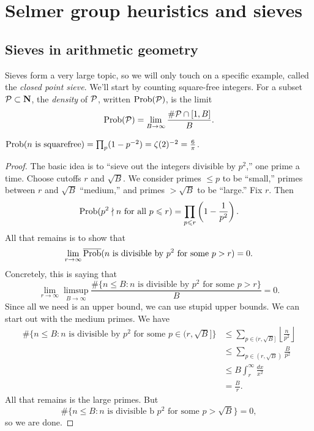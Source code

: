 
\section{Selmer group heuristics and sieves}





\subsection{Sieves in arithmetic geometry}

Sieves form a very large topic, so we will only touch on a specific example, 
called the \emph{closed point sieve}. We'll start by counting square-free 
integers. For a subset $\mathcal{P}\subset \mathbf{N}$, the \emph{density} of $\mathcal{P}$, written 
$\operatorname{Prob}(\mathcal{P})$, is the limit 
\[
  \operatorname{Prob}(\mathcal{P}) = \lim_{B\to \infty} \frac{\# \mathcal{P}\cap [1,B]}{B} .
\]

\begin{theorem}
$\operatorname{Prob}(n\text{ is squarefree})=\prod_p (1-p^{-2}) = \zeta(2)^{-2} = \frac{6}{\pi}$. 
\end{theorem}

\begin{proof}
The basic idea is to ``sieve out the integers divisible by $p^2$,'' one prime 
a time. Choose cutoffs $r$ and $\sqrt B$. We consider primes $\leq p$ to be 
``small,'' primes between $r$ and $\sqrt B$ ``medium,'' and primes $>\sqrt B$ 
to be ``large.'' Fix $r$. Then 
\[
  \operatorname{Prob}(p^2\nmid n\text{ for all $p\leqslant r$}) = \prod_{p\leqslant r} \left(1-\frac{1}{p^2}\right) .
\]
All that remains is to show that 
\[
  \lim_{r\to \infty} \overline{\operatorname{Prob}}(n\text{ is divisible by $p^2$ for some $p>r$}) = 0 .
\]
Concretely, this is saying that 
\[
  \lim_{r\to\infty} \limsup_{B\to \infty} \frac{\#\{n\leq B:n\text{ is divisible by $p^2$ for some $p>r$}\}}{B} = 0 .
\]
Since all we need is an upper bound, we can use stupid upper bounds. We can 
start out with the medium primes. We have 
\begin{align*}
  \# \{n\leq B:n\text{ is divisible by $p^2$ for some $p\in (r,\sqrt B]$}\} 
    &\leq \sum_{p\in (r,\sqrt B]} \left\lfloor\frac{n}{p^2}\right\rfloor \\
    &\leq \sum_{p\in (r,\sqrt B)} \frac{B}{p^2} \\
    &\leq B\int_r^\infty \frac{dx}{x^2} \\
    &= \frac{B}{r} .
\end{align*}
All that remains is the large primes. But 
\[
  \#\{n\leq B:n\text{ is divisible b $p^2$ for some $p>\sqrt B$}\} = 0 ,
\]
so we are done. 
\end{proof}


